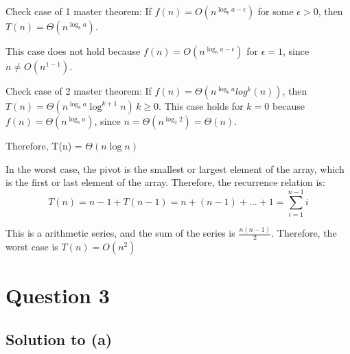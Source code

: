 \documentclass{article}
\begin{document}
\vspace{3mm}

Check case of 1 master theorem: If \(f(n) = O(n^{\log_b a - \epsilon})\) for some \(\epsilon > 0\), then \(T(n) = \Theta(n^{\log_b a})\).

This case does not hold because \(f(n) = O(n^{\log_b a - \epsilon})\) for \(\epsilon = 1\), since \(n \ne O(n^{1-1})\). 

\vspace{3mm}

Check case of 2 master theorem: If \(f(n) = \Theta(n^{\log_b a}
log^k(n))\), then \(T(n) = \Theta(n^{\log_b a} \log^{k+1} n) \, k\ge 0\).
This case holds for \(k=0\) because \(f(n) = \Theta(n^{\log_b a})\), since \(n = \Theta(n^{\log_2 2}) = \Theta(n)\).

Therefore, T(n) = \(\Theta(n \log n)\)

\vspace{6mm}

In the worst case, the pivot is the smallest or largest element of the array, which is the first or last element of the array. Therefore, the recurrence relation is: \[T(n) = n - 1 + T(n-1) = n + (n-1) + \ldots + 1 = \sum_{i=1}^{n-1} i\]

This is a arithmetic series, and the sum of the series is \(\frac{n(n-1)}{2}\). Therefore, the worst case is \(T(n) = O(n^2)\)

\newpage

\section*{Question 3}
\subsection*{Solution to (a)}
\end{document}
